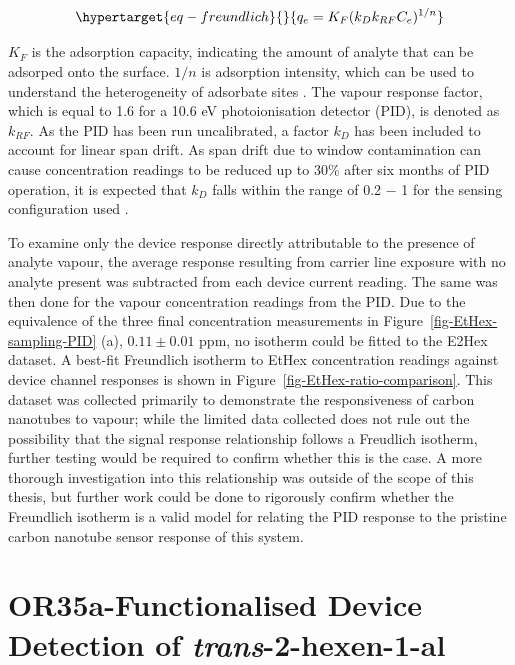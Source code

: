 \documentclass[
  a4paper,
]{scrbook}
\begin{document}
\begin{equation}\protect\hypertarget{eq-freundlich}{}{
q_e = K_F(k_Dk_{RF}C_e)^{1/n}
}\label{eq-freundlich}\end{equation}

\(K_F\) is the adsorption capacity, indicating the amount of analyte
that can be adsorped onto the surface. \(1/n\) is adsorption intensity,
which can be used to understand the heterogeneity of adsorbate sites
\autocite{Ayawei2017,Sabzehmeidani2021}. The vapour response factor,
which is equal to 1.6 for a 10.6 eV photoionisation detector (PID), is
denoted as \(k_{RF}\). As the PID has been run uncalibrated, a factor
\(k_{D}\) has been included to account for linear span drift. As span
drift due to window contamination can cause concentration readings to be
reduced up to 30\% after six months of PID operation, it is expected
that \(k_{D}\) falls within the range of 0.2 \(-\) 1 for the sensing
configuration used \autocite{PIDmanual,Ionscience}.

To examine only the device response directly attributable to the
presence of analyte vapour, the average response resulting from carrier
line exposure with no analyte present was subtracted from each device
current reading. The same was then done for the vapour concentration
readings from the PID. Due to the equivalence of the three final
concentration measurements in Figure~\ref{fig-EtHex-sampling-PID} (a),
\(0.11\pm0.01\) ppm, no isotherm could be fitted to the E2Hex dataset. A
best-fit Freundlich isotherm to EtHex concentration readings against
device channel responses is shown in
Figure~\ref{fig-EtHex-ratio-comparison}. This dataset was collected
primarily to demonstrate the responsiveness of carbon nanotubes to
vapour; while the limited data collected does not rule out the
possibility that the signal response relationship follows a Freudlich
isotherm, further testing would be required to confirm whether this is
the case. A more thorough investigation into this relationship was
outside of the scope of this thesis, but further work could be done to
rigorously confirm whether the Freundlich isotherm is a valid model for
relating the PID response to the pristine carbon nanotube sensor
response of this system.

\hypertarget{or35a-functionalised-device-detection-of-trans-2-hexen-1-al}{%
\section{\texorpdfstring{OR35a-Functionalised Device Detection of
\emph{trans}-2-hexen-1-al}{OR35a-Functionalised Device Detection of trans-2-hexen-1-al}}\label{or35a-functionalised-device-detection-of-trans-2-hexen-1-al}}
\end{document}
